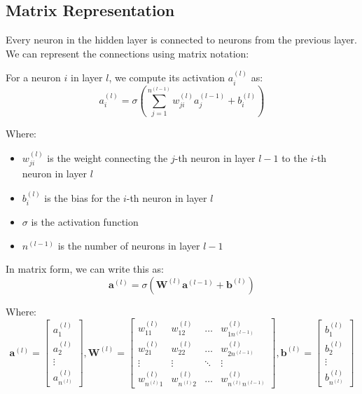 \subsection{Matrix Representation}
Every neuron in the hidden layer is connected to neurons from the previous layer. We can represent the connections using matrix notation:

For a neuron $i$ in layer $l$, we compute its activation $a_i^{(l)}$ as:
\begin{equation}
a_i^{(l)} = \sigma\left(\sum_{j=1}^{n^{(l-1)}} w_{ji}^{(l)} a_j^{(l-1)} + b_i^{(l)}\right)
\end{equation}

Where:
\begin{itemize}
    \item $w_{ji}^{(l)}$ is the weight connecting the $j$-th neuron in layer $l-1$ to the $i$-th neuron in layer $l$
    \item $b_i^{(l)}$ is the bias for the $i$-th neuron in layer $l$
    \item $\sigma$ is the activation function
    \item $n^{(l-1)}$ is the number of neurons in layer $l-1$
\end{itemize}

In matrix form, we can write this as:
\begin{equation}
\mathbf{a}^{(l)} = \sigma(\mathbf{W}^{(l)} \mathbf{a}^{(l-1)} + \mathbf{b}^{(l)})
\end{equation}

Where:
\begin{equation}
\mathbf{a}^{(l)} = 
\begin{bmatrix}
a_1^{(l)} \\
a_2^{(l)} \\
\vdots \\
a_{n^{(l)}}^{(l)}
\end{bmatrix},
\mathbf{W}^{(l)} = 
\begin{bmatrix}
w_{11}^{(l)} & w_{12}^{(l)} & \ldots & w_{1n^{(l-1)}}^{(l)} \\
w_{21}^{(l)} & w_{22}^{(l)} & \ldots & w_{2n^{(l-1)}}^{(l)} \\
\vdots & \vdots & \ddots & \vdots \\
w_{n^{(l)}1}^{(l)} & w_{n^{(l)}2}^{(l)} & \ldots & w_{n^{(l)}n^{(l-1)}}^{(l)}
\end{bmatrix},
\mathbf{b}^{(l)} = 
\begin{bmatrix}
b_1^{(l)} \\
b_2^{(l)} \\
\vdots \\
b_{n^{(l)}}^{(l)}
\end{bmatrix}
\end{equation}

